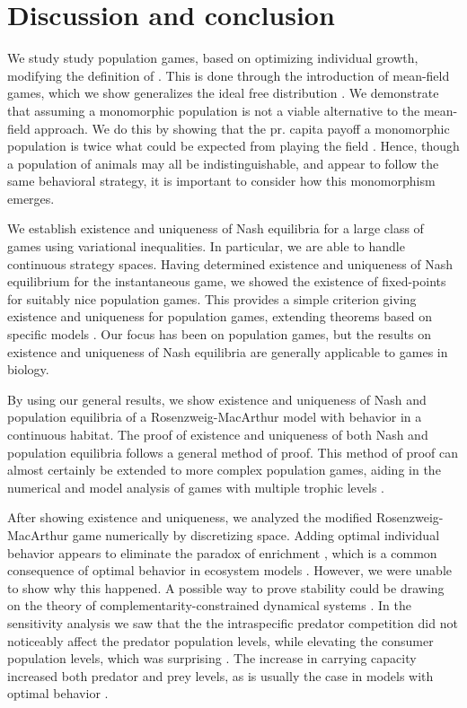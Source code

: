 \section{Discussion and conclusion}
We study study population games, based on optimizing individual growth, modifying the definition of \citep{vincent2005evolutionary}. This is done through the introduction of mean-field games, which we show generalizes the ideal free distribution \citep{fretwell1969territorial}. We demonstrate that assuming a monomorphic population is not a viable alternative to the mean-field approach. We do this by showing that the pr. capita payoff a monomorphic population is twice what could be expected from playing the field  \citep{parker1978searching} . Hence, though a population of animals may all be indistinguishable, and appear to follow the same behavioral strategy, it is important to consider how this monomorphism emerges.


We establish existence and uniqueness of Nash equilibria for a large class of games using variational inequalities. In particular, we are able to handle continuous strategy spaces. Having determined existence and uniqueness of Nash equilibrium for the instantaneous game, we showed the existence of fixed-points for suitably nice population games. This provides a simple criterion giving existence and uniqueness for population games, extending theorems based on specific models \citep{cressman2010ideal,sandholm2010population}. Our focus has been on population games, but the results on existence and uniqueness of Nash equilibria are generally applicable to games in biology.


By using our general results, we show existence and uniqueness of Nash and population equilibria of a Rosenzweig-MacArthur model with behavior in a continuous habitat. The proof of existence and uniqueness of both Nash and population equilibria follows a general method of proof. This method of proof can almost certainly be extended to more complex population games, aiding in the numerical and model analysis of games with multiple trophic levels \cite{pinti2019trophic}.


After showing existence and uniqueness, we analyzed the modified Rosenzweig-MacArthur game numerically by discretizing space. Adding optimal individual behavior appears to eliminate the paradox of enrichment \citep{rosenzweig1971paradox}, which is a common consequence of optimal behavior in ecosystem models \citep{abrams2010implications}. However, we were unable to show why this happened. A possible way to prove stability could be drawing on the theory of complementarity-constrained dynamical systems \citep{adly2018variational,brogliato2020dynamical}. In the sensitivity analysis we saw that the the intraspecific predator competition did not noticeably affect the predator population levels, while elevating the consumer population levels, which was surprising \citep{abrams2010implications}. The increase in carrying capacity increased both predator and prey levels, as is usually the case in models with optimal behavior \citep{valdovinos2010consequences}.



